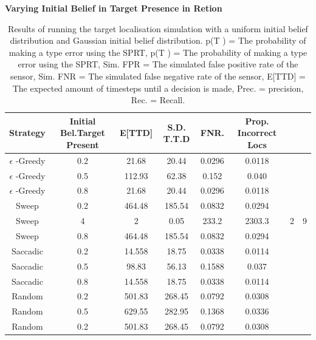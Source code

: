 \textbf{Varying Initial Belief in Target Presence in Retion}
\begin{table}[h!]
    \centering
    \begin{tabular}{|c|c|c|c|c|c|}
    \hline
       Strategy & Initial Bel.Target Present & E[TTD] & S.D. T.T.D & FNR. & Prop. Incorrect Locs \\
        \hline
        $\epsilon$ -Greedy & 0.2 & 21.68 & 20.44 & 0.0296 & 0.0118 \\
        $\epsilon$ -Greedy & 0.5 & 112.93 & 62.38 & 0.152 & 0.040 \\
        $\epsilon$ -Greedy & 0.8 & 21.68 & 20.44 & 0.0296 & 0.0118 \\
        
        Sweep & 0.2 & 464.48 & 185.54 & 0.0832 & 0.0294 \\
        Sweep & 4 & 2 & 0.05 & 233.2 & 2303.3 & 2 & 9\\
        Sweep & 0.8 & 464.48 & 185.54 & 0.0832 & 0.0294 \\

        Saccadic & 0.2 & 14.558 & 18.75 & 0.0338 & 0.0114 \\
        Saccadic & 0.5 & 98.83 & 56.13 & 0.1588 & 0.037 \\
        Saccadic & 0.8 & 14.558 & 18.75 & 0.0338 & 0.0114 \\
        
        Random & 0.2 & 501.83 & 268.45 & 0.0792 & 0.0308 \\
        Random & 0.5 & 629.55 & 282.95 & 0.1368 & 0.0336 \\
        Random & 0.2 & 501.83 & 268.45 & 0.0792 & 0.0308 \\

    \hline
    \end{tabular}

  \caption{Results of running the target localisation simulation with a  uniform initial belief distribution and Gaussian initial belief distribution. p(T ) = The probability of making a type  error using the SPRT, p(T ) = The probability of making a type  error using the SPRT, Sim. FPR = The simulated false positive rate of the sensor, Sim. FNR = The simulated false negative rate of the sensor, E[TTD] = The expected amount of timesteps until a decision is made, Prec. = precision, Rec. = Recall. }\label{table:PriorGaussian}
\end{table}